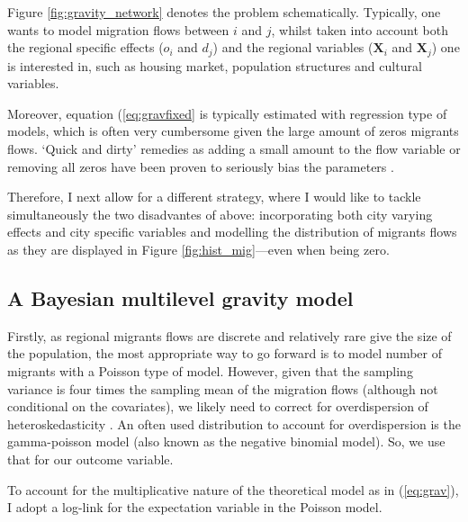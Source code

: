 \documentclass[fleqn,10pt]{SelfArx} %
\begin{document}
        Figure \ref{fig:gravity_network} denotes the problem schematically. Typically, one wants to model migration flows between $i$ and $j$, whilst taken into account both the regional specific effects ($o_i$ and $d_j$) and the regional variables ($\mathbf{X}_i$ and $\mathbf{X}_j$) one is interested  in, such as housing market, population structures and cultural variables. 
                  
        Moreover, equation
        (\ref{eq:gravfixed} is typically estimated with regression
        type of models, which is often very cumbersome given the large
        amount of zeros migrants flows. `Quick and dirty' remedies as adding a small amount to the flow variable or removing all zeros have been proven to seriously bias the parameters \citep{linders2006estimation, burger2009specification}.
        	

        Therefore, I next allow for a different strategy, where I
        would like to tackle simultaneously the two disadvantes of above:
        incorporating both city varying effects and city specific variables and
        modelling the distribution of migrants flows as they are
        displayed in Figure \ref{fig:hist_mig}---even when being zero.

        \subsection{A Bayesian multilevel gravity model}

        Firstly, as regional migrants flows are discrete and
        relatively rare give the size of the population, the most
        appropriate way to go forward is to model number of migrants
        with a Poisson type of model. However, given that the sampling
        variance is four times the sampling mean of the migration
        flows (although not conditional on the covariates), we likely
        need to correct for overdispersion of heteroskedasticity
        \citep[][states that heteroskedasticity (rather than the
        presence of too many zeros) is responsible for the main
        differences.]{silva2006log}. An often used distribution to
        account for overdispersion is the gamma-poisson model (also
        known as the negative binomial model). So, we use that for our
        outcome variable.

        To account for the multiplicative nature of the theoretical
        model as in (\ref{eq:grav}), I adopt a log-link for the
        expectation variable in the Poisson model.
\end{document}
